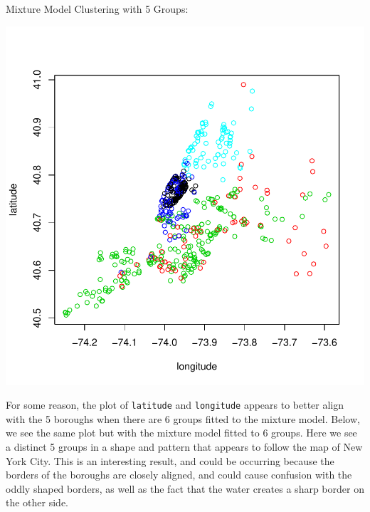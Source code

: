 \documentclass[11pt, a4paper]{article}
\begin{document}
\begin{Schunk}
\begin{Soutput}
Mixture Model Clustering with 5 Groups:
\end{Soutput}
\end{Schunk}
\includegraphics{project_report-018}



For some reason, the plot of \texttt{latitude} and \texttt{longitude} appears to better align with the 5 boroughs when there are 6 groups fitted to the mixture model. Below, we see the same plot but with the mixture model fitted to 6 groups. Here we see a distinct 5 groups in a shape and pattern that appears to follow the map of New York City. This is an interesting result, and could be occurring because the borders of the boroughs are closely aligned, and could cause confusion with the oddly shaped borders, as well as the fact that the water creates a sharp border on the other side. 
\end{document}
